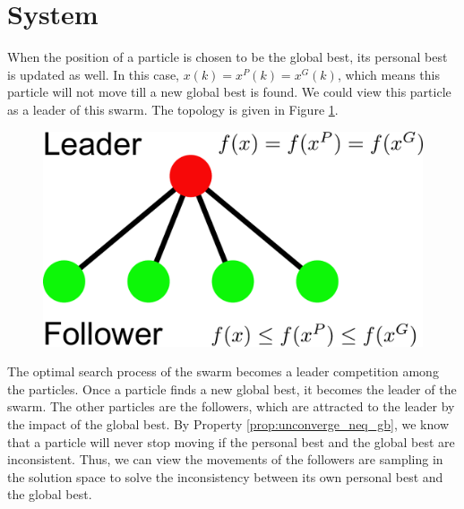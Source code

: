 \section{System}
\label{sec:system}

When the position of a particle is chosen to be the global best, its personal best is updated as well.
In this case, $ x(k) = x^{P}(k) = x^{G}(k) $, which means this particle will not move till a new global best is found.
We could view this particle as a leader of this swarm.
The topology is given in Figure \ref{fig:leader_follower}.

\begin{figure}[tbph]
\centering
\includegraphics[width=0.5\linewidth]{./fig/leader_follower}
\caption{}
\label{fig:leader_follower}
\end{figure}


The optimal search process of the swarm becomes a leader competition among the particles.
Once a particle finds a new global best, it becomes the leader of the swarm.
The other particles are the followers, which are attracted to the leader by the impact of the global best.
By Property \ref{prop:unconverge_neq_gb}, we know that a particle will never stop moving if the personal best and the global best are inconsistent.
Thus, we can view the movements of the followers are sampling in the solution space to solve the inconsistency between its own personal best and the global best.




